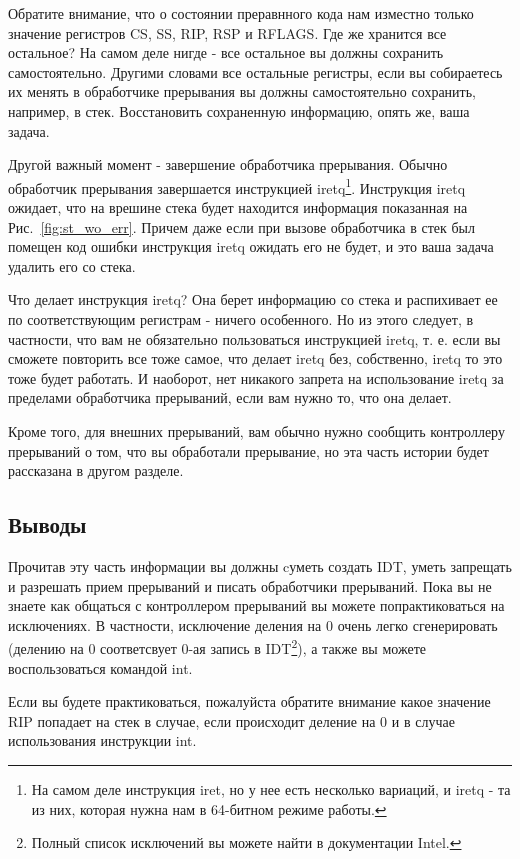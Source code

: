 Обратите внимание, что о состоянии преравнного кода нам изместно только значение
регистров CS, SS, RIP, RSP и RFLAGS. Где же хранится все остальное? На самом
деле нигде - все остальное вы должны сохранить самостоятельно. Другими словами
все остальные регистры, если вы собираетесь их менять в обработчике прерывания
вы должны самостоятельно сохранить, например, в стек. Восстановить сохраненную
информацию, опять же, ваша задача.

Другой важный момент - завершение обработчика прерывания. Обычно обработчик
прерывания завершается инструкцией iretq\footnote{На самом деле инструкция iret,
но у нее есть несколько вариаций, и iretq - та из них, которая нужна нам в
64-битном режиме работы.}. Инструкция iretq ожидает, что на врешине стека будет
находится информация показанная на Рис.~\ref{fig:st_wo_err}. Причем даже если
при вызове обработчика в стек был помещен код ошибки инструкция iretq ожидать
его не будет, и это ваша задача удалить его со стека.

Что делает инструкция iretq? Она берет информацию со стека и распихивает ее по
соответствующим регистрам - ничего особенного. Но из этого следует, в частности,
что вам не обязательно пользоваться инструкцией iretq, т. е. если вы сможете
повторить все тоже самое, что делает iretq без, собственно, iretq то это тоже
будет работать. И наоборот, нет никакого запрета на использование iretq за
пределами обработчика прерываний, если вам нужно то, что она делает.

Кроме того, для внешних прерываний, вам обычно нужно сообщить контроллеру
прерываний о том, что вы обработали прерывание, но эта часть истории будет
рассказана в другом разделе.

\subsection{Выводы}

Прочитав эту часть информации вы должны cуметь создать IDT, уметь запрещать и
разрешать прием прерываний и писать обработчики прерываний. Пока вы не знаете
как общаться с контроллером прерываний вы можете попрактиковаться на
исключениях. В частности, исключение деления на 0 очень легко сгенерировать
(делению на 0 соответсвует 0-ая запись в IDT\footnote{Полный список исключений
вы можете найти в документации Intel.}), а также вы можете воспользоваться
командой int.

Если вы будете практиковаться, пожалуйста обратите внимание какое значение RIP
попадает на стек в случае, если происходит деление на 0 и в случае использования
инструкции int.
